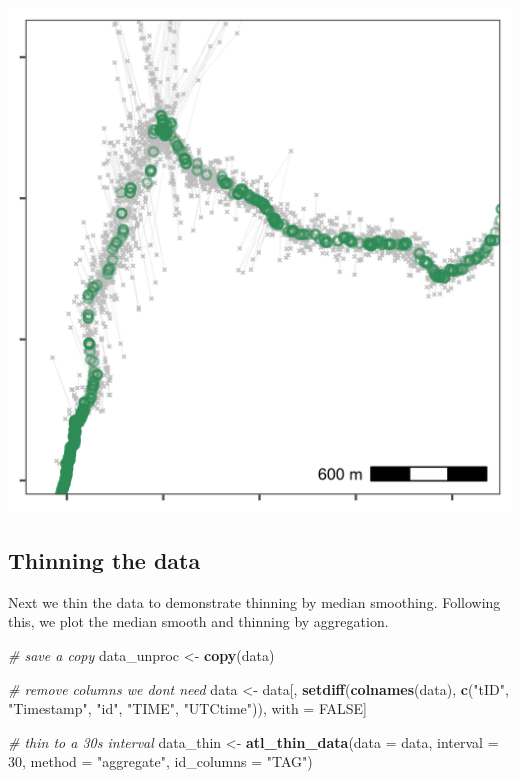\documentclass[
]{scrartcl}
\newenvironment{Shaded}{}{}
\newcommand{\CommentTok}[1]{\textcolor[rgb]{0.38,0.63,0.69}{\textit{#1}}}
\newcommand{\DataTypeTok}[1]{\textcolor[rgb]{0.56,0.13,0.00}{#1}}
\newcommand{\DecValTok}[1]{\textcolor[rgb]{0.25,0.63,0.44}{#1}}
\newcommand{\KeywordTok}[1]{\textcolor[rgb]{0.00,0.44,0.13}{\textbf{#1}}}
\newcommand{\NormalTok}[1]{#1}
\newcommand{\OtherTok}[1]{\textcolor[rgb]{0.00,0.44,0.13}{#1}}
\newcommand{\StringTok}[1]{\textcolor[rgb]{0.25,0.44,0.63}{#1}}
\begin{document}
\includegraphics{figures/fig_calib_median_smooth.png}

\hypertarget{thinning-the-data}{%
\subsection{Thinning the data}\label{thinning-the-data}}

Next we thin the data to demonstrate thinning by median smoothing.
Following this, we plot the median smooth and thinning by aggregation.

\begin{Shaded}
\begin{Highlighting}[]
\CommentTok{\# save a copy}
\NormalTok{data\_unproc <{-}}\StringTok{ }\KeywordTok{copy}\NormalTok{(data)}

\CommentTok{\# remove columns we don\textquotesingle{}t need}
\NormalTok{data <{-}}\StringTok{ }\NormalTok{data[, }\KeywordTok{setdiff}\NormalTok{(}\KeywordTok{colnames}\NormalTok{(data), }
                       \KeywordTok{c}\NormalTok{(}\StringTok{"tID"}\NormalTok{, }\StringTok{"Timestamp"}\NormalTok{, }\StringTok{"id"}\NormalTok{, }\StringTok{"TIME"}\NormalTok{, }\StringTok{"UTCtime"}\NormalTok{)), }
\NormalTok{             with =}\StringTok{ }\OtherTok{FALSE}\NormalTok{]}

\CommentTok{\# thin to a 30s interval}
\NormalTok{data\_thin <{-}}\StringTok{ }\KeywordTok{atl\_thin\_data}\NormalTok{(}\DataTypeTok{data =}\NormalTok{ data,}
                           \DataTypeTok{interval =} \DecValTok{30}\NormalTok{,}
                           \DataTypeTok{method =} \StringTok{"aggregate"}\NormalTok{,}
                           \DataTypeTok{id\_columns =} \StringTok{"TAG"}\NormalTok{)}
\end{Highlighting}
\end{Shaded}
\end{document}
